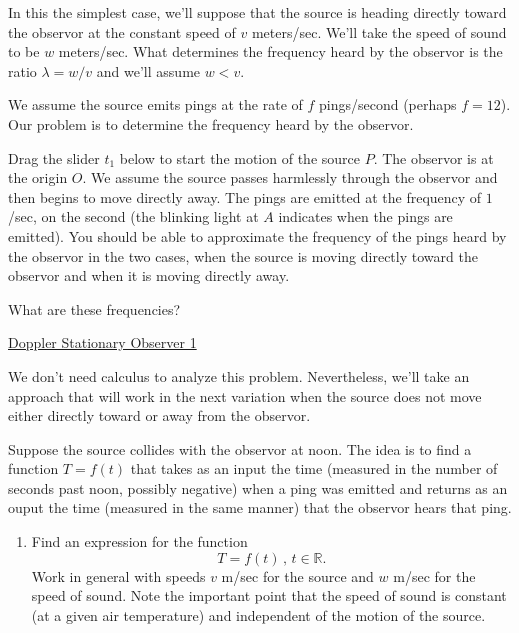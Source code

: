 \documentclass{ximera}
\begin{document}
\begin{example} \label{Exkdfksadfsdt4e4}

In this the simplest case, we'll suppose that the source is heading directly toward the observor at the constant speed of $v$ meters/sec. We'll take the speed of sound to be $w$ meters/sec. What determines the frequency heard by the observor is the ratio $\lambda = w/v$ and we'll assume $w<v$. 

We assume the source emits pings at the rate of $f$ pings/second (perhaps $f=12$). Our problem is to determine the frequency heard by the observor.

Drag the slider $t_1$ below to start the motion of the source $P$. The observor is at the origin $O$. We assume the source passes harmlessly through the observor and then begins to move directly away. The pings are emitted at the frequency of $1$/sec, on the second (the blinking light at $A$ indicates when the pings are emitted). You should be able to approximate the frequency of the pings heard by the observor in the two cases, when the source is moving directly toward the observor and when it is moving directly away. 

What are these frequencies?
\begin{freeResponse}
\end{freeResponse}


\begin{onlineOnly}
    \begin{center}
\end{center}
\end{onlineOnly}

\href{https://www.desmos.com/calculator/h2rw1sr8li}{Doppler Stationary Observer 1}

We don't need calculus to analyze this problem. Nevertheless, we'll take an approach that will work in the next variation when the source does not move either directly toward or away from the observor.

Suppose the source collides with the observor at noon. The idea is to find a function $T=f(t)$ that takes as an input the time (measured in the number of seconds past noon, possibly negative) when a ping was emitted and returns as an ouput the time (measured in the same manner) that the observor hears that ping.

\begin{enumerate}
\item Find an expression for the function 
\[
    T = f(t) \, , \, t \in \mathbb{R}.
\]
Work in general with speeds $v$ m/sec for the source and $w$ m/sec for the speed of sound. Note the important point that the speed of sound is constant (at a given air temperature) and independent of the motion of the source.


\end{enumerate}
\end{example}
\end{document}
